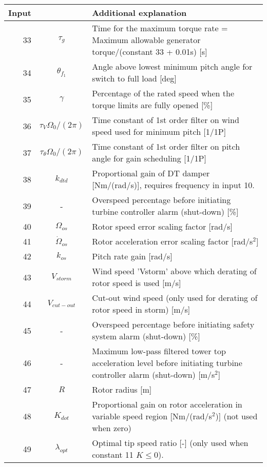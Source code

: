 \begin{table}[t!]
\begin{center}
\begin{tabular}{r|c|p{11.5cm}}
Input &  			& Additional explanation \\ \hline
33 & $\tau_{g}$ 	& Time for the maximum torque rate = Maximum allowable generator torque/(constant 33 + 0.01s) [s] \\
34 & $\theta_{f_1}$ 	& Angle above lowest minimum pitch angle for switch to full load [deg] \\
35 & $\gamma$ 		& Percentage of the rated speed when the torque limits are fully opened [\%] \\
36 & $\tau_V \Omega_0 /(2\pi)$ 		& Time constant of 1st order filter on wind speed used for minimum pitch [1/1P] \\
37 & $\tau_{\theta} \Omega_0 /(2\pi)$ & Time constant of 1st order filter on pitch angle for gain scheduling [1/1P] \\
38 & $k_{dtd}$ 		& Proportional gain of DT damper [Nm/(rad/s)], requires frequency in input 10. \\
\hline
39 & - 			& Overspeed percentage before initiating turbine controller alarm (shut-down) [\%]\\
\hline
40 & $\Omega_{os}$ 	& Rotor speed error scaling factor  [rad/s] \\
41 & $\dot{\Omega}_{os}$ & Rotor acceleration error scaling factor  [rad/s${}^2$] \\
42 & $k_{os}$ 		& Pitch rate gain  [rad/s] \\
\hline
43 & 	$V_{storm}$		& Wind speed 'Vstorm' above which derating of rotor speed is used [m/s] \\
44 & 	$V_{cut-out}$	& Cut-out wind speed (only used for derating of rotor speed in storm) [m/s] \\
\hline
45 &  		-		& Overspeed percentage before initiating safety system alarm (shut-down) [\%] \\
46 &  		-		& Maximum low-pass filtered tower top acceleration level before initiating turbine controller alarm (shut-down) [m/s$^2$] \\
\hline
47 &  		$R$		& Rotor radius [m] \\
\hline
48 &  		$K_{dot}$	& Proportional gain on rotor acceleration in variable speed region [Nm/(rad/s${}^2$)] (not used when zero) \\
\hline
49 &  	$\lambda_{opt}$	& Optimal tip speed ratio [-] (only used when constant 11 $K\le0$). \\

\end{tabular}
\end{center}
\end{table}
